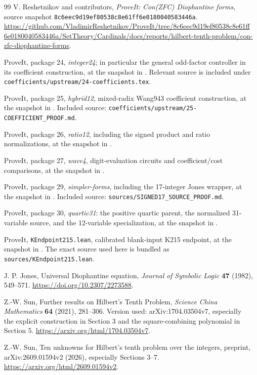 \documentclass[11pt,a4paper]{article}
\numberwithin{equation}{section}
\theoremstyle{definition}
\begin{document}
\begin{thebibliography}{99}
V. Reshetnikov and contributors, \emph{ProveIt: Con(ZFC) Diophantine forms},
source snapshot \texttt{8c6eec9d19ef80538c8e61ff6e0180040583446a}.
\url{https://github.com/VladimirReshetnikov/ProveIt/tree/8c6eec9d19ef80538c8e61ff6e0180040583446a/SetTheory/Cardinals/docs/reports/hilbert-tenth-problem/con-zfc-diophantine-forms}.

ProveIt, package 24, \emph{integer24}; in particular the general
odd-factor controller in its coefficient construction, at the snapshot
in \cite{repo}.  Relevant source is included under
\texttt{coefficients/upstream/24-coefficients.tex}.

ProveIt, package 25, \emph{hybrid12}, mixed-radix Wang943 coefficient
construction, at the snapshot in \cite{repo}.  Included source:
\texttt{coefficients/upstream/25-COEFFICIENT\_PROOF.md}.

ProveIt, package 26, \emph{ratio12}, including the signed product and
ratio normalizations, at the snapshot in \cite{repo}.

ProveIt, package 27, \emph{wave4}, digit-evaluation circuits and
coefficient/cost comparisons, at the snapshot in \cite{repo}.

ProveIt, package 29, \emph{simpler-forms}, including the 17-integer
Jones wrapper, at the snapshot in \cite{repo}.  Included source:
\texttt{sources/SIGNED17\_SOURCE\_PROOF.md}.

ProveIt, package 30, \emph{quartic31}: the positive quartic parent,
the normalized 31-variable source, and the 12-variable specialization,
at the snapshot in \cite{repo}.

ProveIt, \texttt{KEndpoint215.lean}, calibrated blank-input K215 endpoint,
at the snapshot in \cite{repo}.  The exact source used here is bundled
as \texttt{sources/KEndpoint215.lean}.

J. P. Jones, Universal Diophantine equation,
\emph{Journal of Symbolic Logic} \textbf{47} (1982), 549--571.
\url{https://doi.org/10.2307/2273588}.

Z.-W. Sun, Further results on Hilbert's Tenth Problem,
\emph{Science China Mathematics} \textbf{64} (2021), 281--306.
Version used: arXiv:1704.03504v7, especially the explicit construction
in Section 3 and the square-combining polynomial in Section 5.
\url{https://arxiv.org/html/1704.03504v7}.

Z.-W. Sun, Ten unknowns for Hilbert's tenth problem over the integers,
preprint, arXiv:2609.01594v2 (2026), especially Sections 3--7.
\url{https://arxiv.org/html/2609.01594v2}.
\end{thebibliography}
\end{document}
